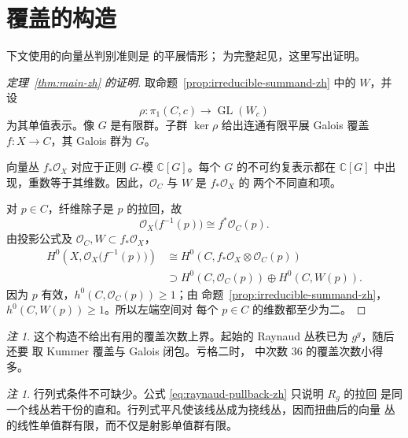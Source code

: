 \documentclass[UTF8,10pt,a4paper]{ctexart}
\theoremstyle{remark}
\newtheorem{remark}[theorem]{注}
\newcommand{\CC}{\mathbb{C}}
\newcommand{\OO}{\mathcal{O}}
\newcommand{\tens}{\otimes}
\begin{document}
\section{覆盖的构造}

下文使用的向量丛判别准则是 \cite[Lemma~5.4]{LandesmanLittPW} 的平展情形；
为完整起见，这里写出证明。

\begin{proof}[定理~\ref{thm:main-zh} 的证明]
取命题~\ref{prop:irreducible-summand-zh} 中的 $W$，并设
\[
  \rho\colon\pi_1(C,c)\longrightarrow\operatorname{GL}(W_c)
\]
为其单值表示。像 $G$ 是有限群。子群 $\ker\rho$ 给出连通有限平展 Galois
覆盖 $f\colon X\to C$，其 Galois 群为 $G$。

向量丛 $f_*\OO_X$ 对应于正则 $G$-模 $\CC[G]$。每个 $G$ 的不可约复表示都在
$\CC[G]$ 中出现，重数等于其维数。因此，$\OO_C$ 与 $W$ 是 $f_*\OO_X$ 的
两个不同直和项。

对 $p\in C$，纤维除子是 $p$ 的拉回，故
\[
  \OO_X\bigl(f^{-1}(p)\bigr)\cong f^*\OO_C(p).
\]
由投影公式及 $\OO_C,W\subset f_*\OO_X$，
\begin{align*}
  H^0\!\left(X,\OO_X\bigl(f^{-1}(p)\bigr)\right)
  &\cong H^0\!\left(C,f_*\OO_X\tens\OO_C(p)\right)\\
  &\supset H^0(C,\OO_C(p))\oplus H^0(C,W(p)).
\end{align*}
因为 $p$ 有效，$h^0(C,\OO_C(p))\geq1$；由
命题~\ref{prop:irreducible-summand-zh}，$h^0(C,W(p))\geq1$。所以左端空间对
每个 $p\in C$ 的维数都至少为二。
\end{proof}

\begin{remark}
这个构造不给出有用的覆盖次数上界。起始的 Raynaud 丛秩已为 $g^g$，随后还要
取 Kummer 覆盖与 Galois 闭包。亏格二时，\cite{LandesmanLitt} 中次数 $36$
的覆盖次数小得多。
\end{remark}

\begin{remark}
行列式条件不可缺少。公式 \eqref{eq:raynaud-pullback-zh} 只说明 $R_g$ 的拉回
是同一个线丛若干份的直和。行列式平凡使该线丛成为挠线丛，因而扭曲后的向量
丛的线性单值群有限，而不仅是射影单值群有限。
\end{remark}

\begingroup
\footnotesize


\endgroup
\end{document}
